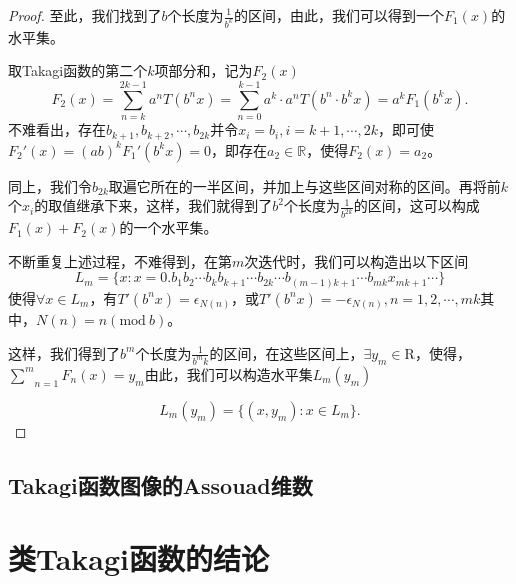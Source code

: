 \begin{proof}
    至此，我们找到了$b$个长度为$\frac{1}{b^k}$的区间，由此，我们可以得到一个$F_1(x)$的水平集。

    取Takagi函数的第二个$k$项部分和，记为$F_2(x)$
    $$
        F_2(x)=\sum_{n=k}^{2k-1}a^nT(b^nx)=\sum_{n=0}^{k-1}a^k\cdot a^nT(b^n\cdot b^kx)=a^kF_1(b^kx).
    $$
    不难看出，存在$b_{k+1},b_{k+2},\cdots,b_{2k}$并令$x_i=b_i,i=k+1,\cdots,2k$，即可使$F_2'(x)=(ab)^kF_1'(b^kx)=0$，即存在$a_2\in\mathbb{R}$，使得$F_2(x)=a_2$。

    同上，我们令$b_{2k}$取遍它所在的一半区间，并加上与这些区间对称的区间。再将前$k$个$x_i$的取值继承下来，这样，我们就得到了$b^2$个长度为$\frac{1}{b^{2k}}$的区间，这可以构成$F_1(x)+F_2(x)$的一个水平集。

    不断重复上述过程，不难得到，在第$m$次迭代时，我们可以构造出以下区间
    $$
        L_m=\{x:x=0.b_1b_2\cdots b_kb_{k+1}\cdots b_{2k}\cdots b_{(m-1)k+1}\cdots b_{mk}x_{mk+1}\cdots\}
    $$
    使得$\forall x\in L_m$，有$T'(b^nx)=\epsilon_{N(n)}$，或$T'(b^nx)=-\epsilon_{N(n)},n=1,2,\cdots,mk$其中，$N(n)=n(\mathrm{mod}~b)$。

    这样，我们得到了$b^m$个长度为$\frac{1}{b^mk}$的区间，在这些区间上，$\exists y_m\in\mathrm{R}$，使得，$\underset{n=1}{\overset{m}{\sum}}F_n(x)=y_m$由此，我们可以构造水平集$L_m(y_m)$

    $$
        L_m(y_m)=\{(x,y_m):x\in L_m\}.
    $$


\end{proof}

\subsection{Takagi函数图像的Assouad维数}


\section{类Takagi函数的结论}

